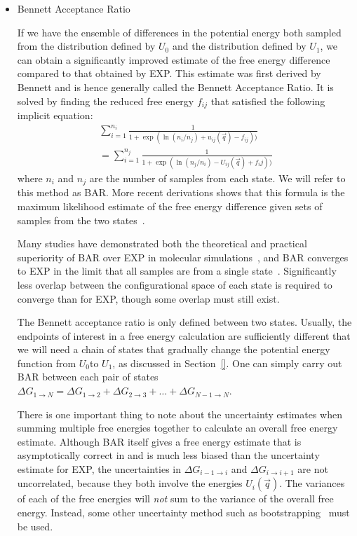 \documentclass[9pt,bestpractices]{livecoms}
\begin{document}
\begin{enumerate}
\begin{itemize}
\item Bennett Acceptance Ratio

If we have the ensemble of differences in the potential energy both sampled from the distribution defined by $U_0$ and the distribution defined by $U_1$, we can obtain a significantly improved estimate of the
free energy difference compared to that obtained by EXP.  
This estimate was first derived by Bennett and is hence generally called the Bennett Acceptance Ratio.  It is solved by finding the reduced free energy $f_{ij}$ that satisfied the following implicit equation:
\begin{eqnarray}
 \sum_{i=1}^{n_i} \frac{1}{1 + \exp(\ln(n_i/n_j) + u_{ij}(\vec{q}) - f_{ij}))} \\
 =\sum_{i=1}^{n_j} \frac{1}{1 + \exp(\ln(n_j/n_i) - U_{ij}(\vec{q}) + f_ij))} 
\end{eqnarray}
where $n_i$ and $n_j$ are the number of samples from each state. We
will refer to this method as BAR. More recent derivations shows that this formula is the maximum likelihood estimate of the free energy difference
given sets of samples from the two states~\cite{shirts.bennett}. 

Many studies have demonstrated both the
theoretical and practical superiority of BAR over EXP in molecular
simulations~\cite{shirts.comparison,LuND:Appmcf}, and BAR converges to EXP in the limit that all samples are from a
single state~\cite{bennettCH,shirts.bennett}. Significantly less
overlap between the configurational space of each state is required to
converge than for EXP, though some overlap must still exist.

The Bennett acceptance ratio is only defined between two states.  Usually, the endpoints of interest in a free energy calculation are sufficiently different that we will need a chain of states that gradually change the potential energy function from $U_0$to $U_1$, as discussed in Section~\ref{}. One can simply carry out BAR between each pair of states $\Delta G_{1 \rightarrow N} = \Delta {G_{1\rightarrow 2}} + \Delta {G_{2\rightarrow 3}} +  \ldots + \Delta G_{N-1\rightarrow N}$.

There is one important thing to note about the uncertainty estimates when summing multiple free energies together to calculate an overall free energy estimate.  Although BAR itself gives a free energy estimate that is asymptotically correct in and is much less biased than the uncertainty estimate for EXP, the uncertainties in $\Delta {G_{i-1\rightarrow i}}$ and $\Delta {G_{i\rightarrow i+1}}$ are not uncorrelated, because they both involve the energies $U_i(\vec{q})$. The variances of each of the free energies will \textit{not} sum to the variance of the overall free energy. Instead, some other uncertainty method such as bootstrapping~\cite{???} must be used.


\end{itemize}
\end{enumerate}
\end{document}
